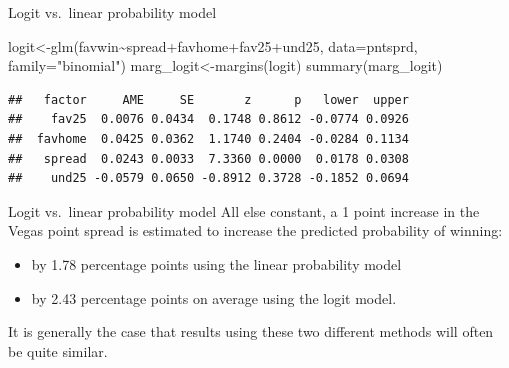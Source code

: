 \documentclass[
  ignorenonframetext,
]{beamer}
\newenvironment{Shaded}{\begin{snugshade}}{\end{snugshade}}
\newcommand{\AttributeTok}[1]{\textcolor[rgb]{0.77,0.63,0.00}{#1}}
\newcommand{\FunctionTok}[1]{\textcolor[rgb]{0.00,0.00,0.00}{#1}}
\newcommand{\NormalTok}[1]{#1}
\newcommand{\OtherTok}[1]{\textcolor[rgb]{0.56,0.35,0.01}{#1}}
\newcommand{\SpecialCharTok}[1]{\textcolor[rgb]{0.00,0.00,0.00}{#1}}
\newcommand{\StringTok}[1]{\textcolor[rgb]{0.31,0.60,0.02}{#1}}
\begin{document}
\begin{frame}[fragile]{Logit vs.~linear probability model}
\protect\hypertarget{logit-vs.-linear-probability-model-1}{}
\footnotesize

\begin{Shaded}
\begin{Highlighting}[]
\NormalTok{logit}\OtherTok{\textless{}{-}}\FunctionTok{glm}\NormalTok{(favwin}\SpecialCharTok{\textasciitilde{}}\NormalTok{spread}\SpecialCharTok{+}\NormalTok{favhome}\SpecialCharTok{+}\NormalTok{fav25}\SpecialCharTok{+}\NormalTok{und25, }
           \AttributeTok{data=}\NormalTok{pntsprd, }\AttributeTok{family=}\StringTok{"binomial"}\NormalTok{)}
\NormalTok{marg\_logit}\OtherTok{\textless{}{-}}\FunctionTok{margins}\NormalTok{(logit)}
\FunctionTok{summary}\NormalTok{(marg\_logit)}
\end{Highlighting}
\end{Shaded}

\begin{verbatim}
##   factor     AME     SE       z      p   lower  upper
##    fav25  0.0076 0.0434  0.1748 0.8612 -0.0774 0.0926
##  favhome  0.0425 0.0362  1.1740 0.2404 -0.0284 0.1134
##   spread  0.0243 0.0033  7.3360 0.0000  0.0178 0.0308
##    und25 -0.0579 0.0650 -0.8912 0.3728 -0.1852 0.0694
\end{verbatim}
\end{frame}

\begin{frame}{Logit vs.~linear probability model}
\protect\hypertarget{logit-vs.-linear-probability-model-2}{}
All else constant, a 1 point increase in the Vegas point spread is
estimated to increase the predicted probability of winning:

\begin{itemize}
\item
  by 1.78 percentage points using the linear probability model
\item
  by 2.43 percentage points on average using the logit model.
\end{itemize}

It is generally the case that results using these two different methods
will often be quite similar.
\end{frame}
\end{document}
